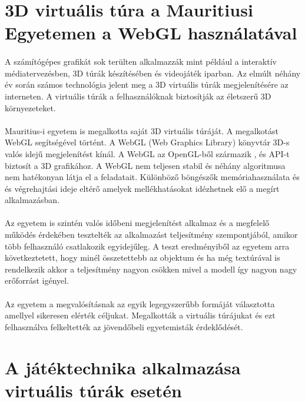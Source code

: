 \section{3D virtuális túra a Mauritiusi Egyetemen a WebGL használatával}
\paragraph{}
A számítógépes grafikát sok terülten alkalmazzák mint például a interaktív médiatervezésben, 3D túrák készítésében és videojáték iparban. Az elmúlt néhány év során számos technológia jelent meg a 3D virtuális túrák megjelenítésére az interneten. A virtuális túrák a felhasználóknak biztosítják az életszerű 3D környezeteket.
\paragraph{} 
Mauritius-i egyetem is megalkotta saját 3D virtuális túráját. A megalkotást WebGL segítségével történt. A WebGL (Web Graphics Library) könyvtár 3D-s valós idejű megjelenítést kínál. A WebGL az OpenGL-ből származik , és API-t biztosít a 3D grafikához.  A WebGL nem teljesen stabil  és néhány algoritmusa nem hatékonyan látja el a feladatait. Különböző böngészők memóriahasználata és és végrehajtási ideje eltérő amelyek mellékhatásokat idézhetnek elő a megírt alkalmazásban.
\paragraph{}
Az egyetem is szintén valós időbeni megjelenítést alkalmaz és a megfelelő működés érdekében tesztelték az alkalmazást teljesítmény szempontjából, amikor több felhasználó csatlakozik egyidejűleg.  A teszt eredményiből az egyetem arra következtetett, hogy minél összetettebb az objektum és ha még textúrával is rendelkezik akkor a teljesítmény nagyon csökken mivel a modell így nagyon nagy erőforrást igényel. 
\paragraph{}
Az egyetem a megvalósításnak az egyik legegyszerűbb formáját választotta amellyel sikeresen elérték céljukat. Megalkották a virtuális túrájukat és ezt felhasználva felkeltették az jövendőbeli egyetemisták érdeklődését.\cite{moloo20163d}

\section{A játéktechnika alkalmazása virtuális túrák esetén}
